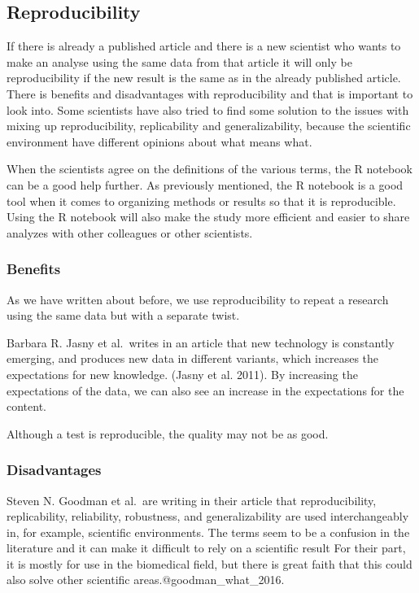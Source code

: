 \documentclass[
]{article}
\begin{document}
\hypertarget{reproducibility}{%
\subsection{\texorpdfstring{\textbf{Reproducibility}}{Reproducibility}}\label{reproducibility}}

If there is already a published article and there is a new scientist who
wants to make an analyse using the same data from that article it will
only be reproducibility if the new result is the same as in the already
published article. There is benefits and disadvantages with
reproducibility and that is important to look into. Some scientists have
also tried to find some solution to the issues with mixing up
reproducibility, replicability and generalizability, because the
scientific environment have different opinions about what means what.

When the scientists agree on the definitions of the various terms, the R
notebook can be a good help further. As previously mentioned, the R
notebook is a good tool when it comes to organizing methods or results
so that it is reproducible. Using the R notebook will also make the
study more efficient and easier to share analyzes with other colleagues
or other scientists.

\hypertarget{benefits}{%
\subsubsection{Benefits}\label{benefits}}

As we have written about before, we use reproducibility to repeat a
research using the same data but with a separate twist.

Barbara R. Jasny et al.~writes in an article that new technology is
constantly emerging, and produces new data in different variants, which
increases the expectations for new knowledge. (Jasny et al. 2011). By
increasing the expectations of the data, we can also see an increase in
the expectations for the content.

Although a test is reproducible, the quality may not be as good.

\hypertarget{disadvantages}{%
\subsubsection{Disadvantages}\label{disadvantages}}

Steven N. Goodman et al.~are writing in their article that
reproducibility, replicability, reliability, robustness, and
generalizability are used interchangeably in, for example, scientific
environments. The terms seem to be a confusion in the literature and it
can make it difficult to rely on a scientific result For their part, it
is mostly for use in the biomedical field, but there is great faith that
this could also solve other scientific areas.@goodman\_what\_2016.
\end{document}
